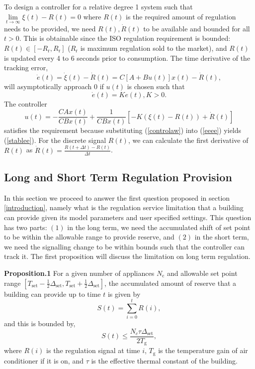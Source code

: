 \documentclass[journal]{IEEEtran}
\begin{document}
To design a controller for a relative degree 1 system such that $\lim\limits_{t\rightarrow\infty}\xi(t)-R(t)=0$ where $R(t)$ is the required amount of regulation needs to be provided, we need $R(t),\dot{R}(t)$ to be available and bounded for all $t>0$. This is obtainable since the ISO regulation requirement is bounded: $R(t)\in[-R_{\textrm{r}},R_{\textrm{r}}]$ ($R_{\textrm{r}}$ is maximum regulation sold to the market), and $R(t)$ is updated every 4 to 6 seconds prior to consumption. The time derivative of the tracking error,
\begin{equation}
\label{eeee}
\dot{e}(t)=\dot{\xi}(t)-\dot{R}(t)=C[A+Bu(t)]x(t) - \dot{R}(t),
\end{equation}
will asymptotically approach 0 if $u(t)$ is chosen such that
\begin{equation}
\label{stablee}
\dot{e}(t)=Ke(t), K>0.
\end{equation}
The controller
\begin{equation}
\label{controlaw}
u(t)=-\frac{CAx(t)}{CBx(t)}+\frac{1}{CBx(t)}[-K(\xi(t)-R(t))+\dot{R}(t)]
\end{equation}
satisfies the requirement because substituting (\ref{controlaw}) into (\ref{eeee}) yields (\ref{stablee}). For the discrete signal $R(t)$, we can calculate the first derivative of $R(t)$ as $\dot{R}(t)=\frac{\displaystyle R(t+\Delta t)-R(t)}{\displaystyle\Delta t}$.

\subsection{Long and Short Term Regulation Provision}
In this section we proceed to answer the first question proposed in section \ref{introduction}, namely what is the regulation service limitation that a building can provide given its model parameters and user specified settings. This question has two parts: $(1)$ in the long term, we need the accumulated shift of set point to be within the allowable range to provide reserve, and $(2)$ in the short term, we need the signalling change to be within bounds such that the controller can track it. The first proposition will discuss the limitation on long term regulation.

\textbf{Proposition.1} For a given number of appliances $N_{\textrm{c}}$ and allowable set point range $[T_{\textrm{set}}-\frac{1}{2}\Delta_{\textrm{set}},T_{\textrm{set}}+\frac{1}{2}\Delta_{\textrm{set}}]$, the accumulated amount of reserve that a building can provide up to time $t$ is given by
\begin{equation}
S(t)=\sum\limits_{i=0}^{t}R(i),
\end{equation}
and this is bounded by,
\begin{equation}
\label{thm1}
S(t)\leq \frac{N_{c}\tau\Delta_{\textrm{set}}}{2T_{\textrm{g}}},
\end{equation}
where $R(i)$ is the regulation signal at time $i$, $T_{\textrm{g}}$ is the temperature gain of air conditioner if it is on, and $\tau$ is the effective thermal constant of the building.
\end{document}
